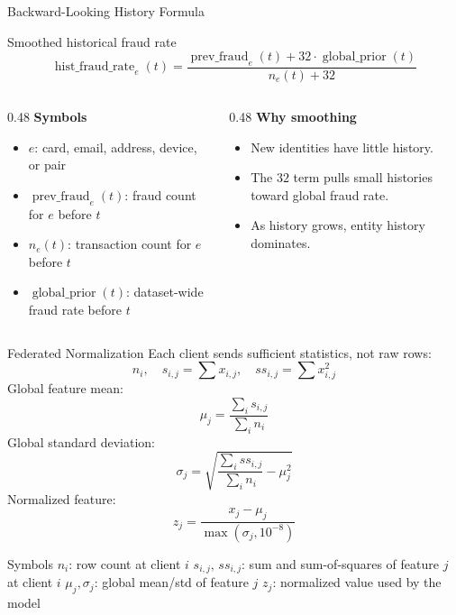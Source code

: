 \documentclass[aspectratio=169,10pt]{beamer}
\begin{document}
\begin{frame}{Backward-Looking History Formula}
  \begin{block}{Smoothed historical fraud rate}
    \[
      \operatorname{hist\_fraud\_rate}_{e}(t)
      =
      \frac{\operatorname{prev\_fraud}_{e}(t) + 32 \cdot \operatorname{global\_prior}(t)}
           {n_e(t) + 32}
    \]
  \end{block}
  \begin{columns}[T]
    \begin{column}{0.48\textwidth}
      \textbf{Symbols}
      \begin{itemize}
        \item \(e\): card, email, address, device, or pair
        \item \(\operatorname{prev\_fraud}_e(t)\): fraud count for \(e\) before \(t\)
        \item \(n_e(t)\): transaction count for \(e\) before \(t\)
        \item \(\operatorname{global\_prior}(t)\): dataset-wide fraud rate before \(t\)
      \end{itemize}
    \end{column}
    \begin{column}{0.48\textwidth}
      \textbf{Why smoothing}
      \begin{itemize}
        \item New identities have little history.
        \item The \(32\) term pulls small histories toward global fraud rate.
        \item As history grows, entity history dominates.
      \end{itemize}
    \end{column}
  \end{columns}
\end{frame}

\begin{frame}{Federated Normalization}
  Each client sends sufficient statistics, not raw rows:
  \[
    n_i,\quad s_{i,j}=\sum x_{i,j},\quad ss_{i,j}=\sum x_{i,j}^2
  \]
  Global feature mean:
  \[
    \mu_j = \frac{\sum_i s_{i,j}}{\sum_i n_i}
  \]
  Global standard deviation:
  \[
    \sigma_j =
    \sqrt{
      \frac{\sum_i ss_{i,j}}{\sum_i n_i}
      - \mu_j^2
    }
  \]
  Normalized feature:
  \[
    z_j = \frac{x_j - \mu_j}{\max(\sigma_j,10^{-8})}
  \]
  \begin{block}{Symbols}
    \footnotesize
    \(n_i\): row count at client \(i\) \quad
    \(s_{i,j},\,ss_{i,j}\): sum and sum-of-squares of feature \(j\) at client \(i\) \quad
    \(\mu_j,\sigma_j\): global mean/std of feature \(j\) \quad
    \(z_j\): normalized value used by the model
  \end{block}
\end{frame}
\end{document}
